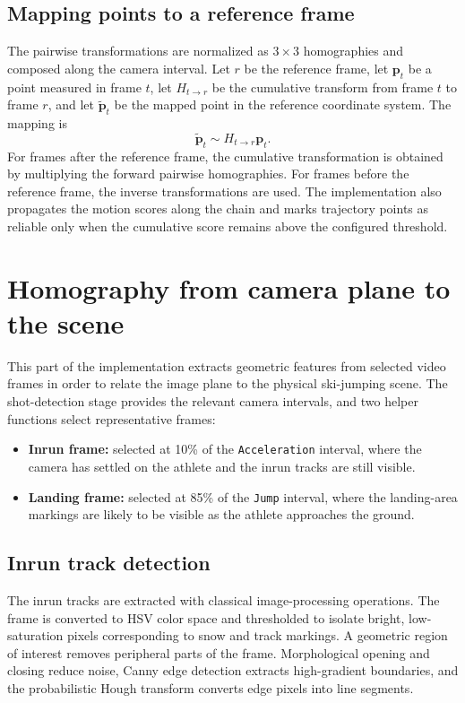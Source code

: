 \subsection{Mapping points to a reference frame}
The pairwise transformations are normalized as \(3 \times 3\) homographies and composed along the camera interval. Let \(r\) be the reference frame, let \(\mathbf{p}_t\) be a point measured in frame \(t\), let \(H_{t \rightarrow r}\) be the cumulative transform from frame \(t\) to frame \(r\), and let \(\tilde{\mathbf{p}}_t\) be the mapped point in the reference coordinate system. The mapping is
\[
\tilde{\mathbf{p}}_t \sim H_{t \rightarrow r}\mathbf{p}_t.
\]
For frames after the reference frame, the cumulative transformation is obtained by multiplying the forward pairwise homographies. For frames before the reference frame, the inverse transformations are used. The implementation also propagates the motion scores along the chain and marks trajectory points as reliable only when the cumulative score remains above the configured threshold.

\section{Homography from camera plane to the scene}\label{Homography}
This part of the implementation extracts geometric features from selected video frames in order to relate the image plane to the physical ski-jumping scene. The shot-detection stage provides the relevant camera intervals, and two helper functions select representative frames:
\begin{itemize}
    \item \textbf{Inrun frame:} selected at 10\% of the \texttt{Acceleration} interval, where the camera has settled on the athlete and the inrun tracks are still visible.
    \item \textbf{Landing frame:} selected at 85\% of the \texttt{Jump} interval, where the landing-area markings are likely to be visible as the athlete approaches the ground.
\end{itemize}

\subsection{Inrun track detection}
The inrun tracks are extracted with classical image-processing operations. The frame is converted to HSV color space and thresholded to isolate bright, low-saturation pixels corresponding to snow and track markings. A geometric region of interest removes peripheral parts of the frame. Morphological opening and closing reduce noise, Canny edge detection extracts high-gradient boundaries, and the probabilistic Hough transform converts edge pixels into line segments.

